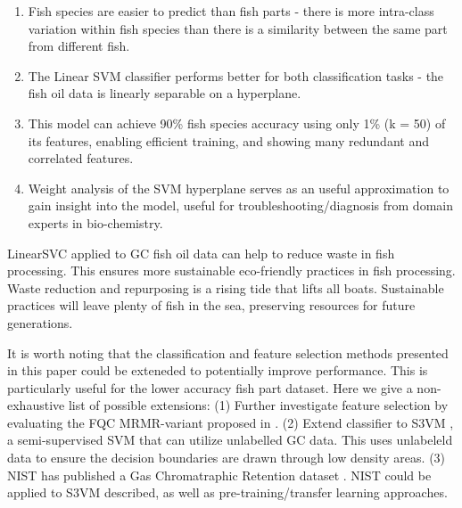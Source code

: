 \documentclass[runningheads]{llncs}
\begin{document}
\begin{enumerate}
  \item Fish species are easier to predict than fish parts - there is more intra-class variation within fish species than there is a similarity between the same part from different fish.
  \item The Linear SVM classifier performs better for both classification tasks - the fish oil data is linearly separable on a hyperplane.
  \item This model can achieve 90\% fish species accuracy using only 1\% (k = 50) of its features, enabling efficient training, and showing many redundant and correlated features. 
  \item Weight analysis of the SVM hyperplane serves as an useful approximation to gain insight into the model, useful for troubleshooting/diagnosis from domain experts in bio-chemistry. 
\end{enumerate}

LinearSVC applied to GC fish oil data can help to reduce waste in fish processing. 
This ensures more sustainable eco-friendly practices in fish processing.
Waste reduction and repurposing is a rising tide that lifts all boats.
Sustainable practices will leave plenty of fish in the sea, preserving resources for future generations. 


It is worth noting that the classification and feature selection methods presented in this paper could be exteneded to potentially improve performance. 
This is particularly useful for the lower accuracy fish part dataset. 
Here we give a non-exhaustive list of possible extensions: 
(1) Further investigate feature selection by evaluating the FQC MRMR-variant proposed in \cite{zhao2019maximum}. 
(2) Extend classifier to S3VM \cite{zemmal2016adaptative}, a semi-supervised SVM that can utilize unlabelled GC data. 
This uses unlabeleld data to ensure the decision boundaries are drawn through low density areas.
(3) NIST has published a Gas Chromatraphic Retention dataset \cite{kovats1958gas}. 
NIST could be applied to S3VM described, as well as pre-training/transfer learning approaches. 
\end{document}
